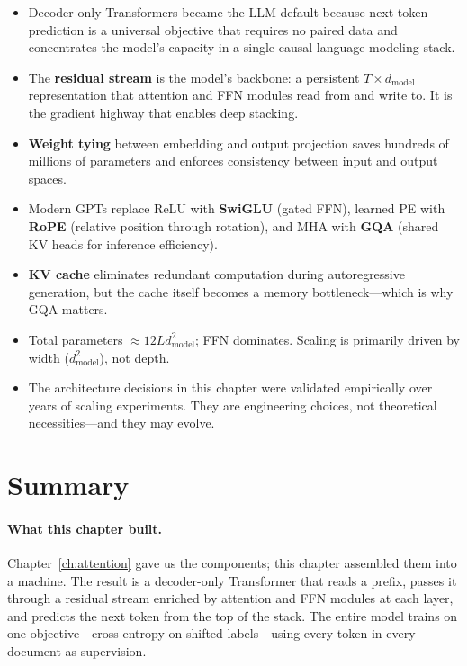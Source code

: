 \begin{takeaways}
\begin{itemize}[leftmargin=1.2em, itemsep=4pt]
  \item Decoder-only Transformers became the LLM default because next-token prediction is a universal objective that requires no paired data and concentrates the model's capacity in a single causal language-modeling stack.
  \item The \textbf{residual stream} is the model's backbone: a persistent $T \times d_\text{model}$ representation that attention and FFN modules read from and write to. It is the gradient highway that enables deep stacking.
  \item \textbf{Weight tying} between embedding and output projection saves hundreds of millions of parameters and enforces consistency between input and output spaces.
  \item Modern GPTs replace ReLU with \textbf{SwiGLU} (gated FFN), learned PE with \textbf{RoPE} (relative position through rotation), and MHA with \textbf{GQA} (shared KV heads for inference efficiency).
  \item \textbf{KV cache} eliminates redundant computation during autoregressive generation, but the cache itself becomes a memory bottleneck---which is why GQA matters.
  \item Total parameters $\approx 12 L d_\text{model}^2$; FFN dominates. Scaling is primarily driven by width ($d_\text{model}^2$), not depth.
  \item The architecture decisions in this chapter were validated empirically over years of scaling experiments. They are engineering choices, not theoretical necessities---and they may evolve.
\end{itemize}
\end{takeaways}


\section{Summary}

\paragraph{What this chapter built.} Chapter~\ref{ch:attention} gave us the components; this chapter assembled them into a machine. The result is a decoder-only Transformer that reads a prefix, passes it through a residual stream enriched by attention and FFN modules at each layer, and predicts the next token from the top of the stack. The entire model trains on one objective---cross-entropy on shifted labels---using every token in every document as supervision.

